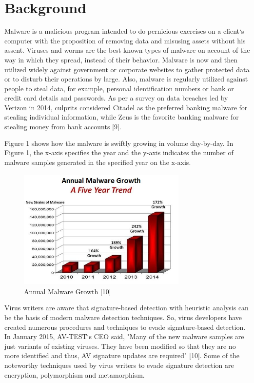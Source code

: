 \chapter{Background}

Malware is a malicious program intended to do pernicious exercises on a client`s computer with the proposition of removing data and misusing assets without his assent. Viruses and worms are the best known types of malware on account of the way in which they spread, instead of their behavior. Malware is now and then utilized widely against government or corporate websites to gather protected data or to disturb their operations by large. Also, malware is regularly utilized against people to steal data, for example, personal identification numbers or bank or credit card details and passwords. As per a survey on data breaches led by Verizon in 2014, culprits considered Citadel as the preferred banking malware for stealing individual information, while Zeus is the favorite banking malware for stealing money from bank accounts [9].

Figure 1 shows how the malware is swiftly growing in volume day-by-day. In Figure 1, the x-axis specifies the year and the y-axis indicates the number of malware samples generated in the specified year on the x-axis.

\begin{figure}
    \centering    
    \includegraphics[width=8.4cm, height=6cm]{malware-growth-chart.jpg}
    \caption[Annual Malware Growth]{Annual Malware Growth [10]}
\end{figure}
Virus writers are aware that signature-based detection with heuristic analysis can be the basis of modern malware detection techniques. So, virus developers have created numerous procedures and techniques to evade signature-based detection. In January 2015, AV-TEST`s CEO said, "Many of the new malware samples are just variants of existing viruses. They have been modified so that they are no more identified and thus, AV signature updates are required" [10]. Some of the noteworthy techniques used by virus writers to evade signature detection are encryption, polymorphism and metamorphism.

